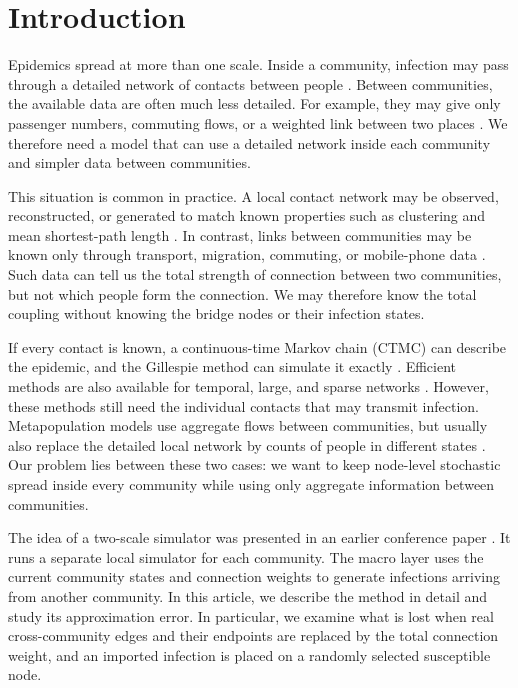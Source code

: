 \documentclass{ieeeaccess}
\begin{document}
\section{Introduction}
\label{sec:introduction}

Epidemics spread at more than one scale. Inside a community, infection may pass through a detailed network of contacts between people \cite{keeling2005,pastorsatorras2015,kiss2017}. Between communities, the available data are often much less detailed. For example, they may give only passenger numbers, commuting flows, or a weighted link between two places \cite{balcan2009,barbosa2018human}. We therefore need a model that can use a detailed network inside each community and simpler data between communities.

This situation is common in practice. A local contact network may be observed, reconstructed, or generated to match known properties such as clustering and mean shortest-path length \cite{eubank2004,danon2011}. In contrast, links between communities may be known only through transport, migration, commuting, or mobile-phone data \cite{barbosa2018human,chang2021}. Such data can tell us the total strength of connection between two communities, but not which people form the connection. We may therefore know the total coupling without knowing the bridge nodes or their infection states.

If every contact is known, a continuous-time Markov chain (CTMC) can describe the epidemic, and the Gillespie method can simulate it exactly \cite{gillespie1977exact,gibson2000}. Efficient methods are also available for temporal, large, and sparse networks \cite{vestergaard2015,kuryliak2025simulating}. However, these methods still need the individual contacts that may transmit infection. Metapopulation models use aggregate flows between communities, but usually also replace the detailed local network by counts of people in different states \cite{colizza2007reaction,colizza2008,balcan2010modeling,ajelli2010}. Our problem lies between these two cases: we want to keep node-level stochastic spread inside every community while using only aggregate information between communities.

The idea of a two-scale simulator was presented in an earlier conference paper \cite{kuryliak2025towards}. It runs a separate local simulator for each community. The macro layer uses the current community states and connection weights to generate infections arriving from another community. In this article, we describe the method in detail and study its approximation error. In particular, we examine what is lost when real cross-community edges and their endpoints are replaced by the total connection weight, and an imported infection is placed on a randomly selected susceptible node.
\end{document}

